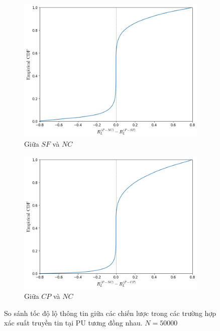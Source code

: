 \documentclass[../main.tex]{subfiles}
\begin{document}
\begin{figure}
\centering
\captionsetup{justification=centering}

\begin{subfigure}{0.8\textwidth}
\centering
\captionsetup{justification=centering}
\includegraphics[width=1\linewidth]{Figures/compare-sameptx-sf.png}
    \caption{Giữa $SF$ và $NC$}
    \label{fig:Compare:Sameptx:rlsf}
\end{subfigure}

\begin{subfigure}{0.8\textwidth}
\centering
\captionsetup{justification=centering}
\includegraphics[width=1\linewidth]{Figures/compare-sameptx-cp.png}
\caption{Giữa $CP$ và $NC$}
\label{fig:Compare:Sameptx:rlcp}
\end{subfigure}
\caption{So sánh tốc độ lộ thông tin giữa các chiến lược trong các trường hợp xác suất truyền tin tại PU tương đồng nhau. $N=50000$}
\end{figure}
\end{document}
